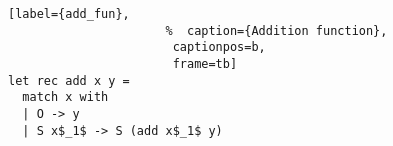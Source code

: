 \begin{figure}[!t]
  \centering
  \begin{minipage}{\columnwidth}
    \begin{lstlisting}[label={add_fun},
                      %  caption={Addition function},
                       captionpos=b,
                       frame=tb]
let rec add x y =
  match x with
  | O -> y
  | S x$_1$ -> S (add x$_1$ y)
    \end{lstlisting}
  \end{minipage}
\end{figure}